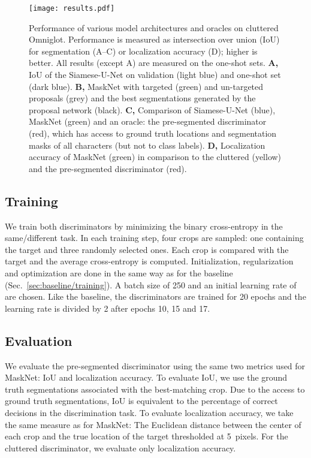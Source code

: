 \documentclass{article}
\begin{document}
\begin{figure*}[t!]
\vskip 0.1in
\begin{center}
\centerline{\texttt{[image: results.pdf]}}
\caption{Performance of various model architectures and oracles on cluttered Omniglot. Performance is measured as intersection over union (IoU) for segmentation (A--C) or localization accuracy (D); higher is better. All results (except A) are measured on the one-shot sets.
\textbf{A,} IoU of the Siamese-U-Net on validation (light blue) and one-shot set (dark blue).
\textbf{B,} MaskNet with targeted (green) and un-targeted proposals (grey) and the best segmentations generated by the proposal network (black).
\textbf{C,} Comparison of Siamese-U-Net (blue), MaskNet (green) and an oracle: the pre-segmented discriminator (red), which has access to ground truth locations and segmentation masks of all characters (but not to class labels).
\textbf{D,} Localization accuracy of MaskNet (green) in comparison to the cluttered (yellow) and the pre-segmented discriminator (red).}
\label{fig:performance_comparison}
\end{center}
\vskip -0.2in
\end{figure*}


\subsection{Training}

We train both discriminators by minimizing the binary cross-entropy in the same/different task.
In each training step, four crops are sampled: one containing the target and three randomly selected ones.
Each crop is compared with the target and the average cross-entropy is computed.
Initialization, regularization and optimization are done in the same way as for the baseline (Sec.~\ref{sec:baseline/training}).
A batch size of 250 and an initial learning rate of  are chosen.
Like the baseline, the discriminators are trained for 20 epochs and the learning rate is divided by 2 after epochs 10, 15 and 17.



\subsection{Evaluation}

We evaluate the pre-segmented discriminator using the same two metrics used for MaskNet: IoU and localization accuracy.
To evaluate IoU, we use the ground truth segmentations associated with the best-matching crop.
Due to the access to ground truth segmentations, IoU is equivalent to the percentage of correct decisions in the discrimination task.
To evaluate localization accuracy, we take the same measure as for MaskNet: The Euclidean distance between the center of each crop and the true location of the target thresholded at 5~pixels.
For the cluttered discriminator, we evaluate only localization accuracy.
\end{document}

